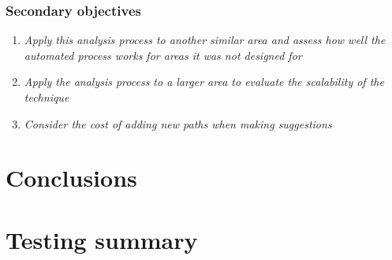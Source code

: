 \documentclass[12pt,a4paper]{report}
\begin{document}
\subsection{Secondary objectives}
\begin{enumerate}
    \item \textit{Apply this analysis process to another similar area and assess how well the automated process works for areas it was not designed for}

    \item \textit{Apply the analysis process to a larger area to evaluate the scalability of the technique}

    \item \textit{Consider the cost of adding new paths when making suggestions}
\end{enumerate}

\chapter{Conclusions}\label{chapter:concl}




\appendix
\chapter{Testing summary}\label{app:test}
\end{document}

